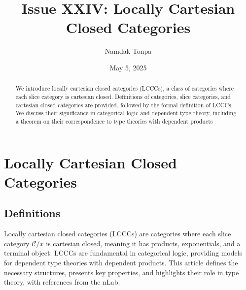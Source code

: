 \documentclass{article}
\theoremstyle{plain}
\theoremstyle{remark}
\begin{document}
\title{Issue XXIV: Locally Cartesian Closed Categories}
\author{Namdak Tonpa}
\date{May 5, 2025}

\maketitle

\begin{abstract}
We introduce locally cartesian closed categories (LCCCs), a class of categories where each slice category is cartesian closed. Definitions of categories, slice categories, and cartesian closed categories are provided, followed by the formal definition of LCCCs. We discuss their significance in categorical logic and dependent type theory, including a theorem on their correspondence to type theories with dependent products
\end{abstract}

\ifincludeTOC
  \tableofcontents
\fi

\section{Locally Cartesian Closed Categories}

\subsection{Definitions}

Locally cartesian closed categories (LCCCs) are categories where each slice category $\mathcal{C}/x$ is cartesian closed, meaning it has products, exponentials, and a terminal object. LCCCs are fundamental in categorical logic, providing models for dependent type theories with dependent products. This article defines the necessary structures, presents key properties, and highlights their role in type theory, with references from the nLab.
\end{document}
